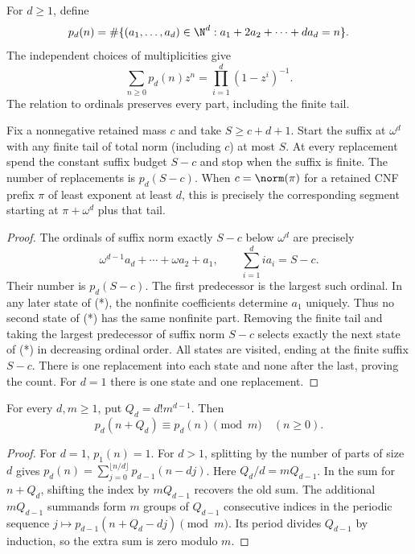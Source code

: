 \documentclass[11pt]{article}
\begin{document}
For $d\ge1$, define
\[
 p_d(n)=\#\{(a_1,\ldots,a_d)\in\N^d:
                         a_1+2a_2+\cdots+da_d=n\}.
\]
The independent choices of multiplicities give
\begin{equation}\label{eq:partition-series}
 \sum_{n\ge0}p_d(n)z^n=\prod_{i=1}^d(1-z^i)^{-1}.
\end{equation}
The relation to ordinals preserves every part, including the finite tail.

\begin{lemma}\label{lem:fixed}
Fix a nonnegative retained mass $c$ and take $S\ge c+d+1$.
Start the suffix at $\omega^d$ with any finite tail of total norm
(including $c$) at most $S$. At every replacement spend the constant
suffix budget $S-c$ and stop when the suffix is finite. The number of
replacements is $p_d(S-c)$. When $c=\norm(\pi)$ for a retained
CNF prefix $\pi$ of least exponent at least $d$, this is precisely
the corresponding segment starting at $\pi+\omega^d$ plus that tail.
\end{lemma}
\begin{proof}
The ordinals of suffix norm exactly $S-c$ below $\omega^d$ are
precisely
\[
 \omega^{d-1}a_d+\cdots+\omega a_2+a_1,\qquad
             \sum_{i=1}^d i a_i=S-c.
 \tag{*}
\]
Their number is $p_d(S-c)$. The first predecessor is the largest
such ordinal. In any later state of (*), the nonfinite coefficients
determine $a_1$ uniquely. Thus no second state of (*) has the same
nonfinite part. Removing the finite tail and taking the largest
predecessor of suffix norm $S-c$ selects exactly the next state of
(*) in decreasing ordinal order. All states are visited, ending at
the finite suffix $S-c$. There is one replacement into each state
and none after the last, proving the count. For $d=1$ there is one
state and one replacement.
\end{proof}

\begin{lemma}\label{lem:period}
For every $d,m\ge1$, put $Q_d=d!m^{d-1}$. Then
\[
             p_d(n+Q_d)\equiv p_d(n)\pmod m\quad(n\ge0).
\]
\end{lemma}
\begin{proof}
For $d=1$, $p_1(n)=1$. For $d>1$, splitting by the number
of parts of size $d$ gives
$p_d(n)=\sum_{j=0}^{\lfloor n/d\rfloor}p_{d-1}(n-dj)$.
Here $Q_d/d=mQ_{d-1}$. In the sum for $n+Q_d$, shifting the
index by $mQ_{d-1}$ recovers the old sum. The additional
$mQ_{d-1}$ summands form $m$ groups of $Q_{d-1}$ consecutive
indices in the periodic sequence
$j\mapsto p_{d-1}(n+Q_d-dj)\pmod m$.
Its period divides $Q_{d-1}$ by induction, so the extra sum is zero
modulo $m$.
\end{proof}
\end{document}
